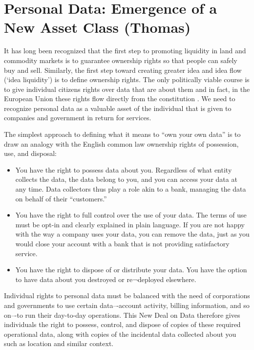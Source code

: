 \section{Personal Data: Emergence of a New Asset Class (Thomas)}

It has long been recognized that the first step to promoting liquidity in land and commodity markets is to guarantee ownership rights so that people can safely buy and sell.
Similarly, the first step toward creating greater idea and idea flow (`idea liquidity’) is to define ownership rights.
The only politically viable course is to give individual citizens rights over data that are about them and in fact, in the European Union these rights flow directly from the constitution .
We need to recognize personal data as a valuable asset of the individual that is given to companies and government in return for services.

The simplest approach to defining what it means to “own your own data” is to draw an analogy with the English common law ownership rights of possession, use, and disposal:

\begin{itemize}
\item You have the right to possess data about you. Regardless of what entity collects the data, the data belong to you, and you can access your data at any time. Data collectors thus play a role akin to a bank, managing the data on behalf of their “customers.”

\item You have the right to full control over the use of your data. The terms of use must be opt-in and clearly explained in plain language. If you are not happy with the way a company uses your data, you can remove the data, just as you would close your account with a bank that is not providing satisfactory service.

\item You have the right to dispose of or distribute your data. You have the option to have data about you destroyed or re¬deployed elsewhere.

\end{itemize}

Individual rights to personal data must be balanced with the need of corporations and governments to use certain data–-account activity, billing information, and so on–-to run their day-to-day operations.
This New Deal on Data therefore gives individuals the right to possess, control, and dispose of copies of these required operational data, along with copies of the incidental data collected about you such as location and similar context.

